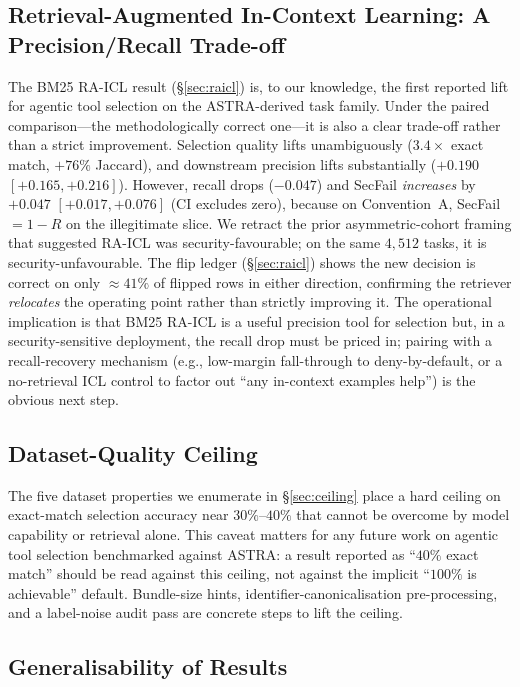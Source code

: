 \documentclass[10pt,a4paper,twocolumn]{article}
\begin{document}
\subsection{Retrieval-Augmented In-Context Learning: A Precision/Recall Trade-off}
\label{sec:raicl_discussion}

The BM25 RA-ICL result (\S\ref{sec:raicl}) is, to our knowledge, the first reported lift for agentic tool selection on the ASTRA-derived task family. Under the paired comparison---the methodologically correct one---it is also a clear trade-off rather than a strict improvement. Selection quality lifts unambiguously ($3.4\times$ exact match, $+76\%$ Jaccard), and downstream precision lifts substantially ($+0.190$ $[+0.165, +0.216]$). However, recall drops ($-0.047$) and SecFail \emph{increases} by $+0.047$ $[+0.017, +0.076]$ (CI excludes zero), because on Convention~A, SecFail $= 1 - R$ on the illegitimate slice. We retract the prior asymmetric-cohort framing that suggested RA-ICL was security-favourable; on the same $4{,}512$ tasks, it is security-unfavourable. The flip ledger (\S\ref{sec:raicl}) shows the new decision is correct on only $\approx 41\%$ of flipped rows in either direction, confirming the retriever \emph{relocates} the operating point rather than strictly improving it. The operational implication is that BM25 RA-ICL is a useful precision tool for selection but, in a security-sensitive deployment, the recall drop must be priced in; pairing with a recall-recovery mechanism (e.g., low-margin fall-through to deny-by-default, or a no-retrieval ICL control to factor out ``any in-context examples help'') is the obvious next step.

\subsection{Dataset-Quality Ceiling}
\label{sec:ceiling_discussion}

The five dataset properties we enumerate in \S\ref{sec:ceiling} place a hard ceiling on exact-match selection accuracy near $30\%$--$40\%$ that cannot be overcome by model capability or retrieval alone. This caveat matters for any future work on agentic tool selection benchmarked against ASTRA: a result reported as ``$40\%$ exact match'' should be read against this ceiling, not against the implicit ``$100\%$ is achievable'' default. Bundle-size hints, identifier-canonicalisation pre-processing, and a label-noise audit pass are concrete steps to lift the ceiling.

\subsection{Generalisability of Results}
\label{sec:generalisability}
\end{document}
